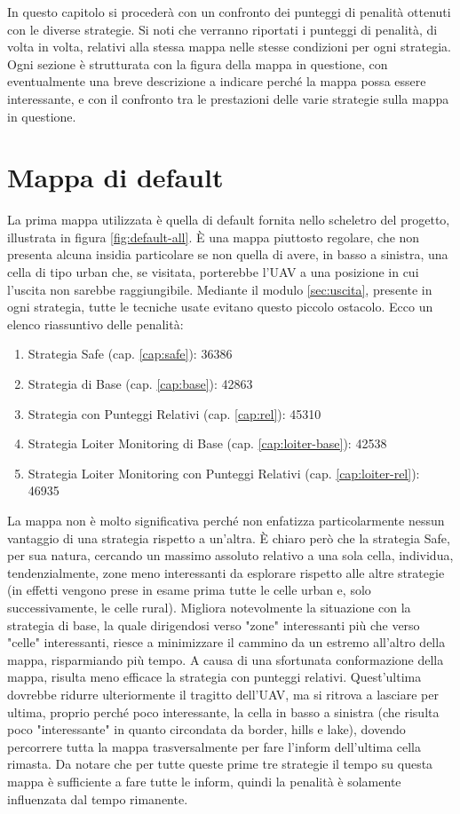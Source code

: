 In questo capitolo si procederà con un confronto dei punteggi di penalità ottenuti con le diverse strategie. Si noti che verranno riportati i punteggi di penalità, di volta in volta, relativi alla stessa mappa nelle stesse condizioni per ogni strategia. Ogni sezione è strutturata con la figura della mappa in questione, con eventualmente una breve descrizione a indicare perché la mappa possa essere interessante, e con il confronto tra le prestazioni delle varie strategie sulla mappa in questione.

\section{Mappa di default}
La prima mappa utilizzata è quella di default fornita nello scheletro del progetto, illustrata in figura \ref{fig:default-all}. È una mappa piuttosto regolare, che non presenta alcuna insidia particolare se non quella di avere, in basso a sinistra, una cella di tipo urban che, se visitata, porterebbe l'UAV a una posizione in cui l'uscita non sarebbe raggiungibile. Mediante il modulo \ref{sec:uscita}, presente in ogni strategia, tutte le tecniche usate evitano questo piccolo ostacolo. Ecco un elenco riassuntivo delle penalità:
\begin{enumerate}
	\item Strategia Safe (cap. \ref{cap:safe}): 36386
	\item Strategia di Base (cap. \ref{cap:base}): 42863
	\item Strategia con Punteggi Relativi (cap. \ref{cap:rel}): 45310
	\item Strategia Loiter Monitoring di Base (cap. \ref{cap:loiter-base}): 42538
	\item Strategia Loiter Monitoring con Punteggi Relativi (cap. \ref{cap:loiter-rel}): 46935
\end{enumerate}

La mappa non è molto significativa perché non enfatizza particolarmente nessun vantaggio di una strategia rispetto a un'altra. È chiaro però che la strategia Safe, per sua natura, cercando un massimo assoluto relativo a una sola cella, individua, tendenzialmente, zone meno interessanti da esplorare rispetto alle altre strategie (in effetti vengono prese in esame prima tutte le celle urban e, solo successivamente, le celle rural). Migliora notevolmente la situazione con la strategia di base, la quale dirigendosi verso "zone" interessanti più che verso "celle" interessanti, riesce a minimizzare il cammino da un estremo all'altro della mappa, risparmiando più tempo.
A causa di una sfortunata conformazione della mappa, risulta meno efficace la strategia con punteggi relativi. Quest'ultima dovrebbe ridurre ulteriormente il tragitto dell'UAV, ma si ritrova a lasciare per ultima, proprio perché poco interessante, la cella in basso a sinistra (che risulta poco "interessante" in quanto circondata da border, hills e lake), dovendo percorrere tutta la mappa trasversalmente per fare l'inform dell'ultima cella rimasta. Da notare che per tutte queste prime tre strategie il tempo su questa mappa è sufficiente a fare tutte le inform, quindi la penalità è solamente influenzata dal tempo rimanente.

